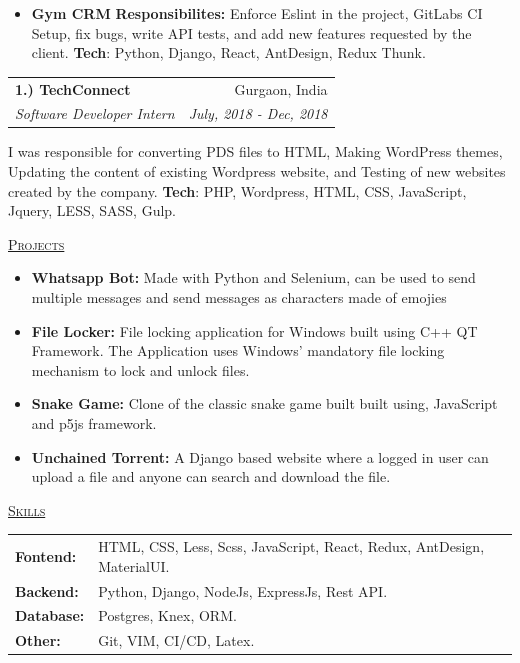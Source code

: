 \documentclass[11pt, a4paper]{article}
\begin{document}
\begin{flushleft}
\begin{itemize}
    \item \textbf{Gym CRM}
    \newline
    \textbf{Responsibilites:} Enforce Eslint in the project, GitLabs CI Setup, fix bugs, write API tests, and add new features requested by the client.
    \newline
    \textbf{Tech}: Python, Django, React, AntDesign, Redux Thunk.
\end{itemize}

\setlength\tabcolsep{0pt}
\begin{tabularx}{\textwidth}{X r}
    \large{\textbf{1.) TechConnect}} & Gurgaon, India\\
    \textit{Software Developer Intern}  & \textit {July, 2018 - Dec, 2018}\\
\end{tabularx}
\newline
\newline
I was responsible for converting PDS files to HTML, Making WordPress themes, Updating the content of existing Wordpress website, and Testing of new websites created by the company.
\newline
\textbf{Tech}: PHP, Wordpress, HTML, CSS, JavaScript, Jquery, LESS, SASS, Gulp.
\newline
\end{flushleft}
\begin{flushleft}
    \uline{\textsc{\large{Projects}}\hfill}
    \begin{itemize}
        \item \textbf{Whatsapp Bot:} Made with Python and Selenium, can be used to send multiple messages and send messages as characters made of emojies
        \item \textbf{File Locker:} File locking application for Windows built using C++ QT Framework. The Application uses Windows’ mandatory file locking mechanism to lock and unlock files.
        \item \textbf{Snake Game:} Clone of the classic snake game built built using, JavaScript and p5js framework.
        \item \textbf{Unchained Torrent:} A Django based website where a logged in user can upload a file and anyone can search and download the file.
    \end{itemize}
\end{flushleft}

\begin{flushleft}
    \uline{\textsc{\large{Skills}}\hfill}
    \newline
    \newline
    \begin{tabular}{l l}
        \textbf{Fontend: } & HTML, CSS, Less, Scss, JavaScript, React, Redux, AntDesign, MaterialUI.\\
        \textbf{Backend: } & Python, Django, NodeJs, ExpressJs, Rest API.\\
        \textbf{Database: } & Postgres, Knex, ORM.\\
        \textbf{Other: } & Git, VIM, CI/CD, Latex.\\
    \end{tabular}
\end{flushleft}
\end{document}
